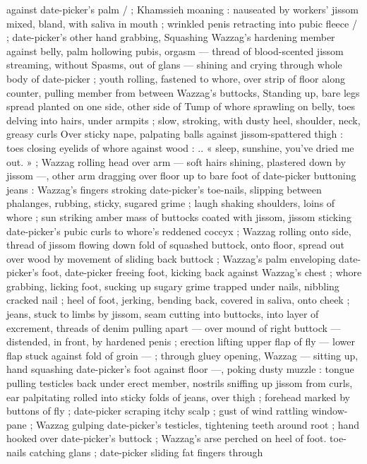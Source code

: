 against date-picker's palm / ; Khamssieh moaning : nauseated by
workers’ jissom mixed, bland, with saliva in mouth ; wrinkled penis
retracting into pubic fleece / ; date-picker's other hand grabbing,
Squashing Wazzag's hardening member against belly, palm hollowing
pubis, orgasm --- thread of blood-scented jissom streaming, without
Spasms, out of glans --- shining and crying through whole body of
date-picker ; youth rolling, fastened to whore, over strip of floor
along counter, pulling member from between Wazzag's buttocks,
Standing up, bare legs spread planted on one side, other side of
Tump of whore sprawling on belly, toes delving into hairs, under
armpits ; slow, stroking, with dusty heel, shoulder, neck, greasy curls
Over sticky nape, palpating balls against jissom-spattered thigh :
toes closing eyelids of whore against wood : .. « sleep, sunshine,
you've dried me out. » ; Wazzag rolling head over arm --- soft hairs
shining, plastered down by jissom ---, other arm dragging over floor
up to bare foot of date-picker buttoning jeans : Wazzag's fingers
stroking date-picker's toe-nails, slipping between phalanges,
rubbing, sticky, sugared grime ; laugh shaking shoulders, loins of
whore ; sun striking amber mass of buttocks coated with jissom,
jissom sticking date-picker's pubic curls to whore's reddened coccyx
; Wazzag rolling onto side, thread of jissom flowing down fold of
squashed buttock, onto floor, spread out over wood by movement of
sliding back buttock ; Wazzag's palm enveloping date-picker's foot,
date-picker freeing foot, kicking back against Wazzag’s chest ; whore
grabbing, licking foot, sucking up sugary grime trapped under nails,
nibbling cracked nail ; heel of foot, jerking, bending back, covered in
saliva, onto cheek ; jeans, stuck to limbs by jissom, seam cutting into
buttocks, into layer of excrement, threads of denim pulling apart ---
over mound of right buttock --- distended, in front, by hardened
penis ; erection lifting upper flap of fly --- lower flap stuck against
fold of groin --- ; through gluey opening, Wazzag --- sitting up, hand
squashing date-picker’s foot against floor ---, poking dusty muzzle :
tongue pulling testicles back under erect member, nostrils sniffing up
jissom from curls, ear palpitating rolled into sticky folds of jeans,
over thigh ; forehead marked by buttons of fly ; date-picker scraping
itchy scalp ; gust of wind rattling window-pane ; Wazzag gulping
date-picker's testicles, tightening teeth around root ; hand hooked
over date-picker's buttock ; Wazzag's arse perched on heel of foot.
toe-nails catching glans ; date-picker sliding fat fingers through
